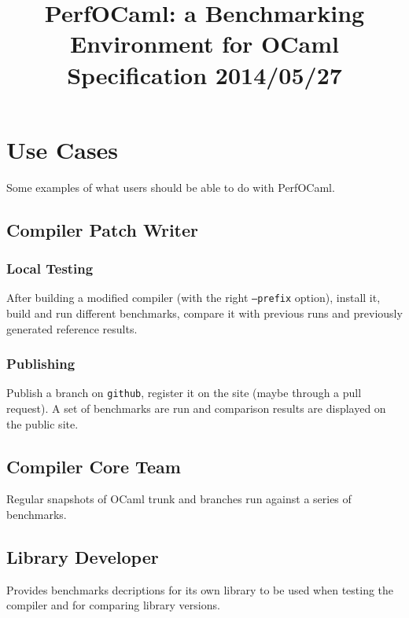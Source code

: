 \documentclass[11pt,a4paper]{article}
\begin{document}
\title{PerfOCaml: a Benchmarking Environment for OCaml\\Specification 2014/05/27}

\maketitle

\section{Use Cases}

Some examples of what users should be able to do with PerfOCaml.

\subsection{Compiler Patch Writer}

\subsubsection{Local Testing}

After building a modified compiler (with the right {\tt --prefix}
option), install it, build and run different benchmarks, compare it
with previous runs and previously generated reference results.

\subsubsection{Publishing}

Publish a branch on {\tt github}, register it on the site (maybe
through a pull request). A set of benchmarks are run and comparison
results are displayed on the public site.

\subsection{Compiler Core Team}

Regular snapshots of OCaml trunk and branches run against a series of
benchmarks.

\subsection{Library Developer}

Provides benchmarks decriptions for its own library to be used when
testing the compiler and for comparing library versions.
\end{document}
